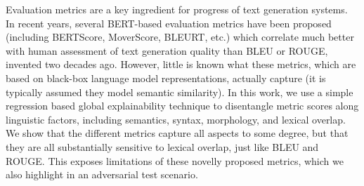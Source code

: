 Evaluation metrics are a key ingredient for progress of text generation systems. In recent years, several BERT-based evaluation metrics have been proposed (including BERTScore, MoverScore, BLEURT, etc.) which correlate much better with human assessment of text generation quality than BLEU or ROUGE, invented two decades ago. However, little is known what these metrics, which are based on black-box language model representations, actually capture (it is typically assumed they model semantic similarity). In this work, we use a simple regression based global explainability technique to disentangle metric scores along linguistic factors, including semantics, syntax, morphology, and lexical overlap. We show that the different metrics capture all aspects to some degree, but that they are all substantially sensitive to lexical overlap, just like BLEU and ROUGE. This exposes limitations of these novelly proposed metrics, which we also highlight in an adversarial test scenario.
